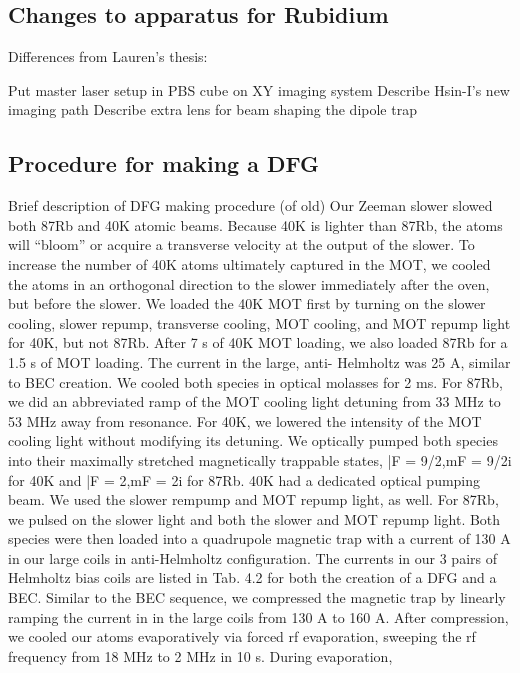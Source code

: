 \subsection{Changes to apparatus for Rubidium}\label{sec:BECchanges}

Differences from Lauren's thesis:

    Put master laser setup in
    PBS cube on XY imaging system
    Describe Hsin-I's new imaging path
    Describe extra lens for beam shaping the dipole trap

\subsection{Procedure for making a DFG}\label{sec:DFGsequence}
Brief description of DFG making procedure (of old)
Our Zeeman slower slowed both 87Rb and 40K atomic beams. Because 40K is
lighter than 87Rb, the atoms will “bloom” or acquire a transverse velocity at the
output of the slower. To increase the number of 40K atoms ultimately captured
in the MOT, we cooled the atoms in an orthogonal direction to the slower immediately
after the oven, but before the slower. We loaded the 40K MOT first by
turning on the slower cooling, slower repump, transverse cooling, MOT cooling,
and MOT repump light for 40K, but not 87Rb. After 7 s of 40K MOT loading,
we also loaded 87Rb for a 1.5 s of MOT loading. The current in the large, anti-
Helmholtz was 25 A, similar to BEC creation.
We cooled both species in optical molasses for 2 ms. For 87Rb, we did an
abbreviated ramp of the MOT cooling light detuning from 33 MHz to 53 MHz
away from resonance. For 40K, we lowered the intensity of the MOT cooling
light without modifying its detuning. We optically pumped both species into
their maximally stretched magnetically trappable states, |F = 9/2,mF = 9/2i for
40K and |F = 2,mF = 2i for 87Rb. 40K had a dedicated optical pumping beam. We
used the slower rempump and MOT repump light, as well. For 87Rb, we pulsed
on the slower light and both the slower and MOT repump light.
Both species were then loaded into a quadrupole magnetic trap with a current
of 130 A in our large coils in anti-Helmholtz configuration. The currents in
our 3 pairs of Helmholtz bias coils are listed in Tab. 4.2 for both the creation of a
DFG and a BEC. Similar to the BEC sequence, we compressed the magnetic trap
by linearly ramping the current in in the large coils from 130 A to 160 A. After
compression, we cooled our atoms evaporatively via forced rf evaporation,
sweeping the rf frequency from 18 MHz to 2 MHz in 10 s. During evaporation,
